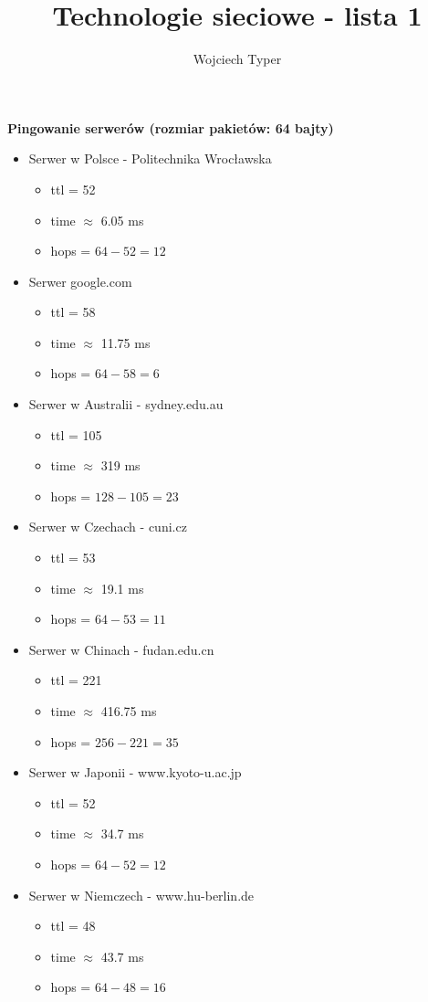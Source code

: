 \documentclass{article}
\title{Technologie sieciowe - lista 1}
\author{Wojciech Typer}
\date{}
\begin{document}
\maketitle
\vspace{1\baselineskip}
\textbf{Pingowanie serwerów (rozmiar pakietów: 64 bajty)}
\vspace{1\baselineskip}
\begin{itemize}
    \item Serwer w Polsce - Politechnika Wrocławska
    \begin{itemize}
        \item ttl = 52
        \item time $\approx$ 6.05 ms 
        \item hops = $64 - 52 = 12$
    \end{itemize}
    \item Serwer google.com
    \begin{itemize}
        \item ttl = 58
        \item time $\approx$ 11.75 ms
        \item hops = $64 - 58 = 6$
    \end{itemize}
    \item Serwer w Australii - sydney.edu.au
    \begin{itemize}
        \item ttl = 105
        \item time $\approx$ 319 ms
        \item hops = $128 - 105 = 23$
    \end{itemize}
    \item Serwer w Czechach - cuni.cz 
    \begin{itemize}
        \item ttl = 53
        \item time $\approx$ 19.1 ms
        \item hops = $64 - 53 = 11$
    \end{itemize} 
    \item Serwer w Chinach - fudan.edu.cn 
    \begin{itemize}
        \item ttl = 221
        \item time $\approx$ 416.75 ms
        \item hops = $256 - 221 = 35$
    \end{itemize}
    \item Serwer w Japonii - www.kyoto-u.ac.jp
    \begin{itemize}
        \item ttl = 52
        \item time $\approx$ 34.7 ms
        \item hops = $64 - 52 = 12$
    \end{itemize}
    \item Serwer w Niemczech - www.hu-berlin.de
    \begin{itemize}
        \item ttl = 48
        \item time $\approx$ 43.7 ms
        \item hops = $64 - 48 = 16$
    \end{itemize}
\end{itemize}
\end{document}
